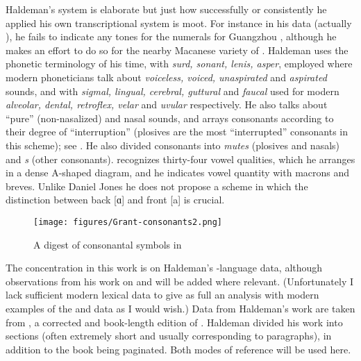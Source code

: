 \documentclass[output=paper]{LSP/langsci}
\begin{document}
Haldeman's system is elaborate but just how successfully or consistently he applied his own transcriptional system is moot. For instance in his  data (actually ), he fails to indicate any tones for the numerals for Guangzhou , although he makes an effort to do so for  the nearby Macanese variety of .  Haldeman uses the phonetic terminology of his time, with \textit{surd, sonant, lenis, asper}, employed where modern phoneticians talk about \textit{voiceless, voiced, unaspirated} and \textit{aspirated} sounds, and with \textit{sigmal, lingual, cerebral, guttural} and \textit{faucal} used for modern \textit{alveolar, dental, retroflex, velar} and \textit{uvular} respectively. He also talks about ``pure'' (non-nasalized) and  nasal  sounds, and arrays consonants according to their degree of ``interruption'' (plosives are the most ``interrupted'' consonants in this scheme); see . He also divided consonants into \textit{mutes} (plosives and nasals) and \textit{s} (other consonants).  \citet[83, 369]{Haldeman1860} recognizes thirty-four vowel qualities, which he arranges in a dense A-shaped diagram, and he indicates vowel quantity with macrons and breves. Unlike Daniel Jones \citeyearpar{Jones1909} he does not propose a scheme in which the distinction between back [ɑ] and front [a] is crucial.  

\begin{figure} 
\caption{A digest of consonantal symbols in \citealt[121: \S576]{Haldeman1860}} \label{haldemandigest}

\texttt{[image: figures/Grant-consonants2.png]}
\end{figure}

The concentration in this work is on Haldeman's -language data, although observations from his work on  and  will be added where relevant. (Unfortunately I lack sufficient modern lexical data to give as full an analysis with modern examples of the  and  data as I would wish.)   Data from Haldeman's work are taken from \citet{Haldeman1860}, a corrected and book-length edition of \citet{Haldeman1859}.  Haldeman divided his work into sections (often extremely short and usually corresponding to paragraphs), in addition to the book being paginated.  Both modes of reference will be used here.  
\end{document}
